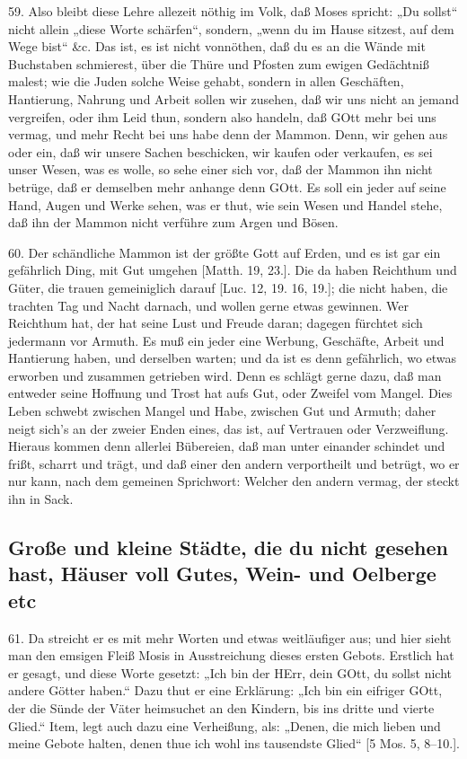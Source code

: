 59. Also bleibt diese Lehre allezeit nöthig im Volk, daß Moses spricht: „Du sollst“ nicht allein „diese Worte schärfen“, sondern, „wenn du im Hause sitzest, auf dem Wege bist“ \&c. Das ist, es ist nicht vonnöthen, daß du es an die Wände mit Buchstaben schmierest, über die Thüre und Pfosten zum ewigen Gedächtniß malest; wie die Juden solche Weise gehabt, sondern in allen Geschäften, Hantierung, Nahrung und Arbeit sollen wir zusehen, daß wir uns nicht an jemand vergreifen, oder ihm Leid thun, sondern also handeln, daß GOtt mehr bei uns vermag, und mehr
Recht bei uns habe denn der Mammon. Denn, wir gehen aus oder ein, daß wir unsere Sachen beschicken, wir kaufen oder verkaufen, es sei unser Wesen, was es wolle, so sehe einer sich vor, daß der Mammon ihn nicht betrüge, daß er demselben mehr anhange denn GOtt. Es soll ein jeder auf seine Hand, Augen und Werke sehen, was er thut, wie sein Wesen und Handel stehe, daß ihn der Mammon nicht verführe zum Argen und Bösen.

60. Der schändliche Mammon ist der größte Gott auf Erden, und es ist gar ein gefährlich Ding, mit Gut umgehen [Matth. 19, 23.]. Die da haben Reichthum und Güter, die trauen gemeiniglich darauf [Luc. 12, 19. 16, 19.]; die nicht haben, die trachten Tag und Nacht darnach, und wollen gerne etwas gewinnen. Wer Reichthum hat, der hat seine Lust und Freude daran; dagegen fürchtet sich jedermann vor Armuth. Es muß ein jeder eine Werbung, Geschäfte, Arbeit und Hantierung haben, und derselben warten; und da ist es denn gefährlich, wo etwas erworben und zusammen getrieben wird. Denn es schlägt gerne dazu, daß man entweder seine Hoffnung und Trost hat aufs Gut, oder Zweifel vom Mangel. Dies Leben schwebt zwischen Mangel und Habe, zwischen Gut und Armuth; daher neigt sich’s an der zweier Enden eines, das ist, auf Vertrauen oder Verzweiflung. Hieraus kommen denn allerlei Bübereien, daß man unter einander schindet und frißt, scharrt und trägt, und daß einer den andern verportheilt und betrügt, wo er nur kann, nach dem gemeinen Sprichwort: Welcher den andern vermag, der steckt ihn in Sack.

\subsection[Große und kleine Städte, die du nicht gesehen hast,]{Große und kleine Städte, die du nicht gesehen hast, Häuser voll Gutes, Wein- und Oelberge etc}

61. Da streicht er es mit mehr Worten und etwas weitläufiger aus; und hier sieht man den emsigen Fleiß Mosis in Ausstreichung dieses ersten Gebots. Erstlich hat er gesagt, und diese Worte gesetzt: „Ich bin der HErr, dein GOtt, du sollst nicht andere Götter haben.“ Dazu thut er eine Erklärung: „Ich bin ein eifriger GOtt, der die Sünde der Väter heimsuchet an den Kindern, bis ins dritte und vierte Glied.“ Item, legt auch dazu eine Verheißung, als: „Denen, die mich lieben und meine Gebote halten, denen thue ich wohl ins tausendste Glied“ [5 Mos. 5, 8–10.].

